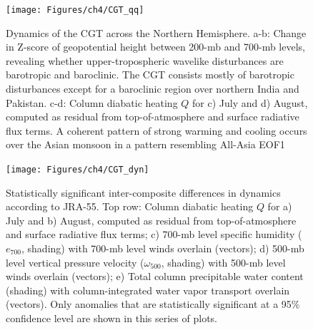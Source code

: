 \begin{figure}
\centering
\noindent\texttt{[image: Figures/ch4/CGT\_qq]}
\caption{Dynamics of the CGT across the Northern Hemisphere. a-b: Change in Z-score of geopotential height between 200-mb and 700-mb levels, revealing whether upper-tropospheric wavelike disturbances are barotropic and baroclinic. The CGT consists mostly of barotropic disturbances except for a baroclinic region over northern India and Pakistan. c-d: Column diabatic heating $Q$ for c) July and d) August, computed as residual from top-of-atmosphere and surface radiative flux terms. A coherent pattern of strong warming and cooling occurs over the Asian monsoon in a pattern resembling All-Asia EOF1}
\label{fig:cgt_dyn}
\end{figure}

\begin{figure}
\centering
\noindent\texttt{[image: Figures/ch4/CGT\_dyn]}
\caption{Statistically significant inter-composite differences in dynamics according to JRA-55. Top row: Column diabatic heating $Q$ for a) July and b) August, computed as residual from top-of-atmosphere and surface radiative flux terms; c) 700-mb level specific humidity ($e_{700}$, shading) with 700-mb level winds overlain (vectors); d) 500-mb level vertical pressure velocity ($\omega_{500}$, shading) with 500-mb level winds overlain (vectors); e) Total column precipitable water content (shading) with column-integrated water vapor transport overlain (vectors). Only anomalies that are statistically significant at a 95\% confidence level are shown in this series of plots.}
\label{fig:cgt_dyn}
\end{figure}

